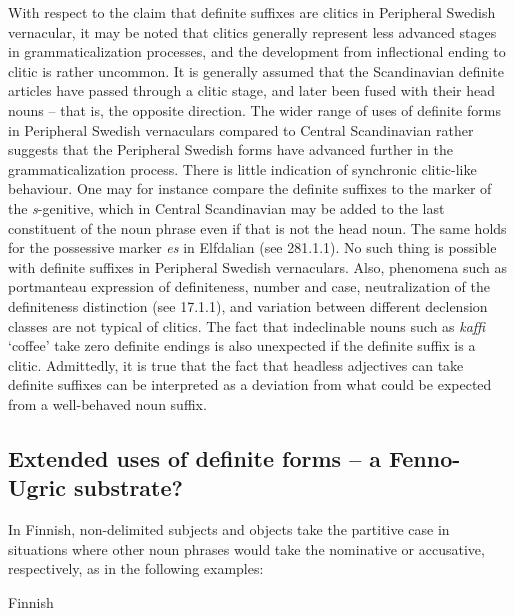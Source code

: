 \begin{styleBodytextC}
With respect to the claim that definite suffixes are clitics in Peripheral Swedish vernacular, it may be noted that clitics generally represent less advanced stages in grammaticalization processes, and the development from inflectional ending to clitic is rather uncommon. It is generally assumed that the Scandinavian definite articles have passed through a clitic stage, and later been fused with their head nouns – that is, the opposite direction. The wider range of uses of definite forms in Peripheral Swedish vernaculars compared to Central Scandinavian rather suggests that the Peripheral Swedish forms have advanced further in the grammaticalization process. There is little indication of synchronic clitic-like behaviour. One may for instance compare the definite suffixes to the marker of the \textit{s}{}-genitive, which in Central Scandinavian may be added to the last constituent of the noun phrase even if that is not the head noun. The same holds for the possessive marker \textit{es} in Elfdalian (see 281.1.1). No such thing is possible with definite suffixes in Peripheral Swedish vernaculars. Also, phenomena such as portmanteau expression of definiteness, number and case, neutralization of the definiteness distinction (see 17.1.1), and variation between different declension classes are not typical of clitics. The fact that indeclinable nouns such as \textit{kaffi} ‘coffee’ take zero definite endings is also unexpected if the definite suffix is a clitic. Admittedly, it is true that the fact that headless adjectives can take definite suffixes can be interpreted as a deviation from what could be expected from a well-behaved noun suffix.

\end{styleBodytextC}

\subsection{\rmfamily Extended uses of definite forms – a Fenno-Ugric substrate?}

\begin{styleBodyTextFirst}
In Finnish, non-delimited subjects and objects take the partitive case in situations where other noun phrases would take the nominative or accusative, respectively, as in the following examples:

\end{styleBodyTextFirst}

\begin{listWWNumileveli}
\item {}

\begin{styleExample}
Finnish

\end{styleExample}

\end{listWWNumileveli}

